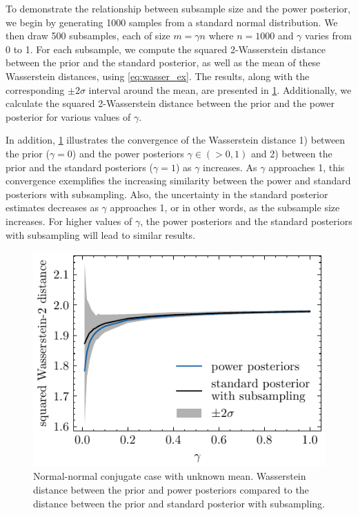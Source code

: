 \documentclass[12pt]{article}
\begin{document}
To demonstrate the relationship between subsample size and the power posterior, we begin by generating 1000 samples from a standard normal distribution. We then draw 500 subsamples, each of size $m = \gamma n$ where $n = 1000$ and $\gamma$ varies from 0 to 1. For each subsample, we compute the squared 2-Wasserstein distance between the prior and the standard posterior, as well as the mean of these Wasserstein distances, using \cref{eq:wasser_ex}. The results, along with the corresponding $\pm 2\sigma$  interval around the mean, are presented in \cref{fig:normal_normal_compare_with_subsampling}. Additionally, we calculate the squared 2-Wasserstein distance between the prior and the power posterior for various values of $\gamma$. 

In addition, \cref{fig:normal_normal_compare_with_subsampling} illustrates the convergence of the Wasserstein distance 1) between the prior ($\gamma=0$) and the power posteriors $\gamma \in (>0, 1)$ and  2) between the prior and the standard posteriors ($\gamma=1$)  as $\gamma$ increases. As $\gamma$ approaches 1, this convergence exemplifies the increasing similarity between the power and standard posteriors with subsampling. Also, the uncertainty in the standard posterior estimates decreases as $\gamma$ approaches 1, or in other words, as the subsample size increases. For higher values of $\gamma$, the power posteriors and the standard posteriors with subsampling will lead to similar results. 

\FloatBarrier
\begin{figure}[h!]
\begin{center}
\includegraphics{imgs/gauss_knownsigma_subsample.pdf}
\end{center}
\caption{Normal-normal conjugate case with unknown mean. Wasserstein distance between the prior and power posteriors compared to the distance between the prior and standard posterior with subsampling.}\label{fig:normal_normal_compare_with_subsampling}
\end{figure}
\end{document}
